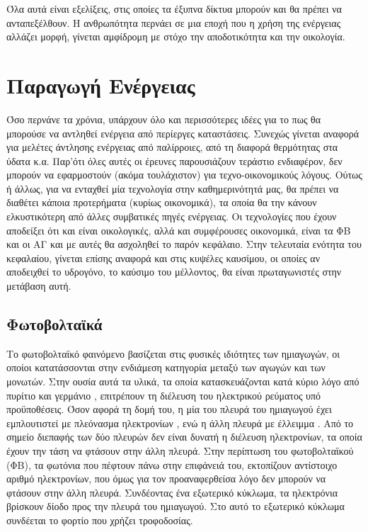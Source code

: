 \documentclass[12pt]{report}
\begin{document}
Όλα αυτά είναι εξελίξεις, στις οποίες τα έξυπνα δίκτυα μπορούν και θα πρέπει να ανταπεξέλθουν. Η ανθρωπότητα περνάει σε μια εποχή που η χρήση της ενέργειας αλλάζει μορφή, γίνεται αμφίδρομη με στόχο την αποδοτικότητα
και την οικολογία.
\chapter{Παραγωγή Ενέργειας}
Όσο περνάνε τα χρόνια, υπάρχουν όλο και περισσότερες ιδέες για το πως θα μπορούσε να αντληθεί ενέργεια από περίεργες καταστάσεις. Συνεχώς γίνεται αναφορά για μελέτες άντλησης ενέργειας από παλίρροιες, από τη διαφορά θερμότητας
στα ύδατα κ.α. Παρ'ότι όλες αυτές οι έρευνες παρουσιάζουν τεράστιο ενδιαφέρον, δεν μπορούν να εφαρμοστούν (ακόμα τουλάχιστον) για τεχνο-οικονομικούς λόγους. Ούτως ή άλλως, για να ενταχθεί μία τεχνολογία στην καθημερινότητά μας, 
θα πρέπει να διαθέτει κάποια προτερήματα (κυρίως οικονομικά), τα οποία θα την κάνουν ελκυστικότερη από άλλες συμβατικές πηγές ενέργειας. Οι τεχνολογίες που έχουν αποδείξει ότι και είναι οικολογικές, αλλά και
συμφέρουσες οικονομικά, είναι τα ΦΒ και οι ΑΓ και με αυτές θα ασχοληθεί το παρόν κεφάλαιο. Στην τελευταία ενότητα του κεφαλαίου, γίνεται επίσης αναφορά και στις κυψέλες καυσίμου, οι οποίες αν αποδειχθεί το υδρογόνο, 
το καύσιμο του μέλλοντος, θα είναι πρωταγωνιστές στην μετάβαση αυτή.

\section{Φωτοβολταϊκά}
Το φωτοβολταϊκό φαινόμενο βασίζεται στις φυσικές ιδιότητες των ημιαγωγών, οι οποίοι κατατάσσονται στην ενδιάμεση κατηγορία μεταξύ των αγωγών και των μονωτών. Στην ουσία αυτά τα υλικά, τα οποία κατασκευάζονται κατά κύριο λόγο
από πυρίτιο {} και γερμάνιο {}, επιτρέπουν τη διέλευση του ηλεκτρικού ρεύματος υπό προϋποθέσεις. Όσον αφορά τη δομή του, η μία του πλευρά του ημιαγωγού έχει εμπλουτιστεί με πλεόνασμα ηλεκτρονίων 
{}, ενώ η άλλη πλευρά με έλλειμμα {}. Από το σημείο διεπαφής {} των δύο πλευρών δεν είναι δυνατή η διέλευση ηλεκτρονίων, τα οποία έχουν την τάση να φτάσουν στην άλλη πλευρά.
Στην περίπτωση του φωτοβολταϊκού (ΦΒ), τα φωτόνια που πέφτουν πάνω στην επιφάνειά του, εκτοπίζουν αντίστοιχο αριθμό ηλεκτρονίων, που όμως για τον προαναφερθείσα λόγο δεν μπορούν να φτάσουν στην άλλη πλευρά. Συνδέοντας ένα εξωτερικό 
κύκλωμα, τα ηλεκτρόνια βρίσκουν δίοδο προς την {} πλευρά του ημιαγωγού. Στο αυτό το εξωτερικό κύκλωμα συνδέεται το φορτίο που χρήζει τροφοδοσίας.
\end{document}
